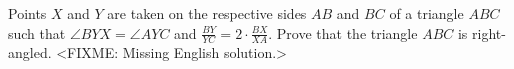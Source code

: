 \problem
Points $X$ and $Y$ are taken on the respective sides $AB$ and $BC$ of a
triangle $ABC$ such that $\angle BYX = \angle AYC$ and
$\frac{BY}{YC} = 2 \cdot \frac{BX}{XA}$.
Prove that the triangle $ABC$ is right-angled.
\solution
<FIXME: Missing English solution.>
\endproblem
